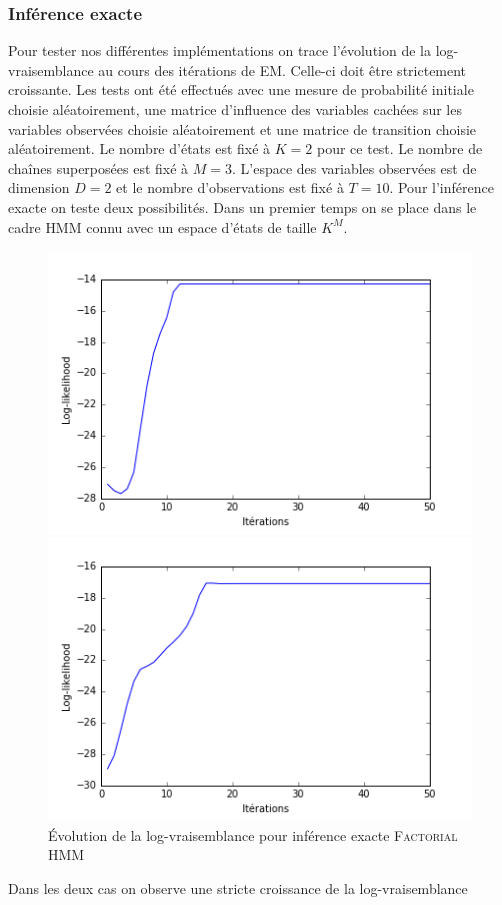 \documentclass[10pt,a4paper]{article}
\newcommand{\hmm}{\textsc{HMM}}
\newcommand{\fhmm}{\textsc{Factorial HMM}}
\newcommand{\EM}{\textsc{EM}}
\begin{document}
\subsubsection{Inférence exacte}
Pour tester nos différentes implémentations on trace l'évolution de la 
log-vraisemblance au cours des itérations de \EM.
Celle-ci doit être strictement croissante.
Les tests ont été effectués avec une mesure de probabilité initiale choisie 
aléatoirement, une matrice d'influence des variables cachées sur les variables 
observées choisie aléatoirement et une matrice de transition choisie 
aléatoirement. Le nombre d'états est fixé à $K = 2$ pour ce test. Le nombre de 
chaînes superposées est fixé à $M = 3$. L'espace des variables observées est de 
dimension $D=2$ et le nombre d'observations est fixé à $T=10$. Pour 
l'inférence 
exacte on teste deux possibilités. Dans un premier temps on se place dans le 
cadre \hmm{} connu avec un espace d'états de taille $K^M$.
\begin{figure}[H]
\centering
\begin{minipage}{.45\linewidth}
\centering
\includegraphics[scale=0.3]{../resources/pictures/M3_K2_hmm.png}
\caption{Évolution de la log-vraisemblance pour inférence exacte \hmm}
\end{minipage}
\begin{minipage}{.45\linewidth}
\centering
\includegraphics[scale=0.3]{../resources/pictures/M3_K2_fhmm_exact.png}
\caption{Évolution de la log-vraisemblance pour inférence exacte \fhmm}
\end{minipage}
\end{figure}
Dans les deux cas on observe une stricte croissance de la log-vraisemblance
\end{document}

